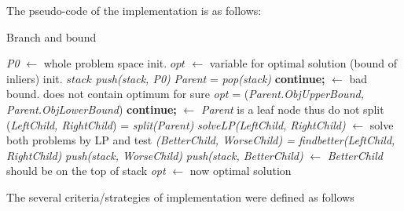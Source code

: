 \documentclass[paper=a4, fontsize=11pt]{scrartcl} %
\numberwithin{equation}{section} %
\numberwithin{figure}{section} %
\numberwithin{table}{section} %
\begin{document}
The pseudo-code of the implementation is as follows: 

\begin{algorithm}
\caption{Branch and bound}\label{euclid}
\begin{algorithmic}[1]
\State \textit{P0} $\gets$ whole problem space
\State init. $\textit{opt}$ $\gets$ variable for optimal solution (bound of inliers)
\State init. $\textit{stack}$ 
\State \textit{push(stack, P0)}
\State 
{}
	\State \textit{Parent} = \textit{pop(stack)}
		\State \textbf{continue;} $\gets$ bad bound. does not contain optimum for sure
	\EndIf
	\State
        		\State \textit{opt} = (\textit{Parent.ObjUpperBound, Parent.ObjLowerBound})
        \EndIf
        	\State
        		\State \textbf{continue;} $\gets$ \textit{Parent} is a leaf node thus do not split
        \EndIf
        \State
        \State (\textit{LeftChild, RightChild}) = \textit{split(Parent)}
        \State \textit{solveLP(LeftChild, RightChild)} $\gets$ solve both problems by LP and test
	\State
	\State \textit{(BetterChild, WorseChild) = findbetter(LeftChild, RightChild)}
	\State \textit{push(stack, WorseChild)}	
	\State \textit{push(stack, BetterChild)} $\gets$ \textit{BetterChild} should be on the top of stack
\EndWhile
\State
\State \textit{opt} $\gets$ now optimal solution  
\end{algorithmic}
\end{algorithm}

\pagebreak

The several criteria/strategies of implementation were defined as follows
\end{document}
